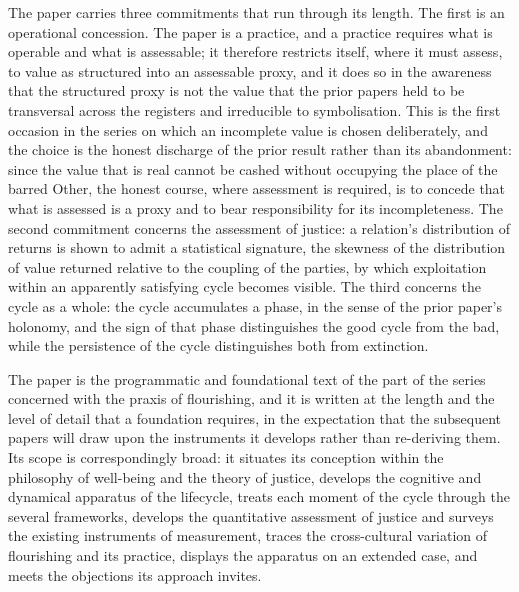 The paper carries three commitments that run through its length. The first is an operational concession. The paper is a practice, and a practice requires what is operable and what is assessable; it therefore restricts itself, where it must assess, to value as structured into an assessable proxy, and it does so in the awareness that the structured proxy is not the value that the prior papers held to be transversal across the registers and irreducible to symbolisation. This is the first occasion in the series on which an incomplete value is chosen deliberately, and the choice is the honest discharge of the prior result rather than its abandonment: since the value that is real cannot be cashed without occupying the place of the barred Other, the honest course, where assessment is required, is to concede that what is assessed is a proxy and to bear responsibility for its incompleteness. The second commitment concerns the assessment of justice: a relation's distribution of returns is shown to admit a statistical signature, the skewness of the distribution of value returned relative to the coupling of the parties, by which exploitation within an apparently satisfying cycle becomes visible. The third concerns the cycle as a whole: the cycle accumulates a phase, in the sense of the prior paper's holonomy, and the sign of that phase distinguishes the good cycle from the bad, while the persistence of the cycle distinguishes both from extinction.

The paper is the programmatic and foundational text of the part of the series concerned with the praxis of flourishing, and it is written at the length and the level of detail that a foundation requires, in the expectation that the subsequent papers will draw upon the instruments it develops rather than re-deriving them. Its scope is correspondingly broad: it situates its conception within the philosophy of well-being and the theory of justice, develops the cognitive and dynamical apparatus of the lifecycle, treats each moment of the cycle through the several frameworks, develops the quantitative assessment of justice and surveys the existing instruments of measurement, traces the cross-cultural variation of flourishing and its practice, displays the apparatus on an extended case, and meets the objections its approach invites.

